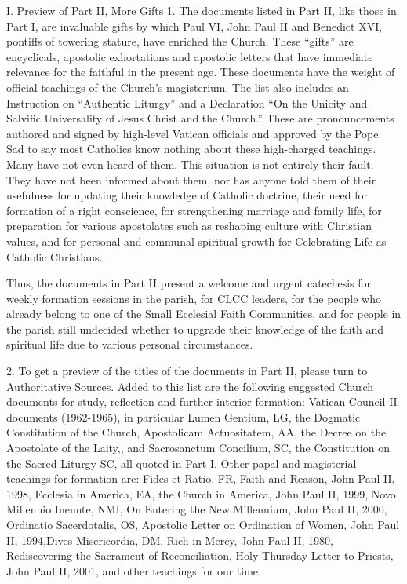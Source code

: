 \documentclass[oneside]{book}
\begin{document}
I. Preview of Part II, More Gifts
1. The documents listed in Part II, like those in Part I, are invaluable gifts
by which Paul VI, John Paul II and Benedict XVI, pontiffs of towering stature,
have enriched the Church. These ``gifts'' are encyclicals, apostolic
exhortations and apostolic letters that have immediate relevance for the
faithful in the present age. These documents have the weight of official
teachings of the Church's magisterium. The list also includes an Instruction on
``Authentic Liturgy'' and a Declaration ``On the Unicity and Salvific
Universality of Jesus Christ and the Church.'' These are pronouncements authored
and signed by high-level Vatican officials and approved by the Pope.
Sad to say most Catholics know nothing about these high-charged teachings. Many
have not even heard of them. This situation is not entirely their fault. They
have not been informed about them, nor has anyone told them of their usefulness
for updating their knowledge of Catholic doctrine, their need for formation of a
right conscience, for strengthening marriage and family life, for preparation
for various apostolates such as reshaping culture with Christian values, and for
personal and communal spiritual growth for Celebrating Life as Catholic
Christians.

Thus, the documents in Part II present a welcome and urgent catechesis for
weekly formation sessions in the parish, for CLCC leaders, for the people who
already belong to one of the Small Ecclesial Faith Communities, and for people
in the parish still undecided whether to upgrade their knowledge of the faith
and spiritual life due to various personal circumstances.

2. To get a preview of the titles of the documents in Part II, please turn to
Authoritative Sources. Added to this list are the following suggested Church
documents for study, reflection and further interior formation: Vatican Council
II documents (1962-1965), in particular Lumen Gentium, LG, the Dogmatic
Constitution of the Church, Apostolicam Actuositatem, AA, the Decree on the
Apostolate of the Laity,, and Sacrosanctum Concilium, SC, the Constitution on
the Sacred Liturgy SC, all quoted in Part I.
Other papal and magisterial teachings for formation are: Fides et Ratio, FR,
Faith and Reason, John Paul II, 1998, Ecclesia in America, EA, the Church in
America, John Paul II, 1999, Novo Millennio Ineunte, NMI, On Entering the New
Millennium, John Paul II, 2000, Ordinatio Sacerdotalis, OS, Apostolic Letter on
Ordination of Women, John Paul II, 1994,Dives Misericordia, DM, Rich in Mercy,
John Paul II, 1980, Rediscovering the Sacrament of Reconciliation, Holy Thursday
Letter to Priests, John Paul II, 2001, and other teachings for our time.
\end{document}

